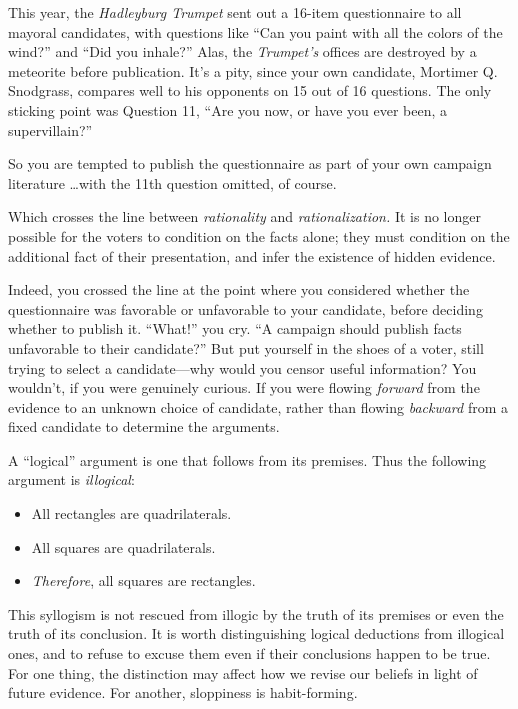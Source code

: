 {
 This year, the \textit{Hadleyburg Trumpet} sent out a 16-item
questionnaire to all mayoral candidates, with questions like
``Can you paint with all the colors of the
wind?'' and ``Did you
inhale?'' Alas, the
\textit{Trumpet's} offices are destroyed by a meteorite
before publication. It's a pity, since your own
candidate, Mortimer Q. Snodgrass, compares well to his opponents on 15
out of 16 questions. The only sticking point was Question 11,
``Are you now, or have you ever been, a
supervillain?''}

{
 So you are tempted to publish the questionnaire as part of your
own campaign literature \ldots with the 11th question omitted, of
course.}

{
 Which crosses the line between \textit{rationality} and
\textit{rationalization.} It is no longer possible for the voters to
condition on the facts alone; they must condition on the additional
fact of their presentation, and infer the existence of hidden
evidence.}

{
 Indeed, you crossed the line at the point where you considered
whether the questionnaire was favorable or unfavorable to your
candidate, before deciding whether to publish it.
``What!'' you cry.
``A campaign should publish facts unfavorable to their
candidate?'' But put yourself in the shoes of a
voter, still trying to select a candidate---why would you censor useful
information? You wouldn't, if you were genuinely
curious. If you were flowing \textit{forward} from the evidence to an
unknown choice of candidate, rather than flowing \textit{backward} from
a fixed candidate to determine the arguments.}

{
 A ``logical'' argument is one
that follows from its premises. Thus the following argument is
\textit{illogical}:}

\begin{itemize}
\item  All rectangles are quadrilaterals.
\item  All squares are quadrilaterals.
\item  \textit{Therefore}, all squares are rectangles.
\end{itemize}

{
 This syllogism is not rescued from illogic by the truth of its
premises or even the truth of its conclusion. It is worth
distinguishing logical deductions from illogical ones, and to refuse to
excuse them even if their conclusions happen to be true. For one thing,
the distinction may affect how we revise our beliefs in light of future
evidence. For another, sloppiness is habit-forming.}

